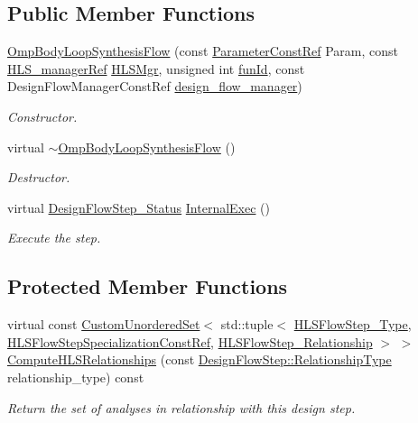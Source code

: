 \subsection*{Public Member Functions}
\begin{DoxyCompactItemize}
\item 
\hyperlink{classOmpBodyLoopSynthesisFlow_aae94b58f7ca30ae522a0c8ba5797b39f}{Omp\+Body\+Loop\+Synthesis\+Flow} (const \hyperlink{Parameter_8hpp_a37841774a6fcb479b597fdf8955eb4ea}{Parameter\+Const\+Ref} Param, const \hyperlink{hls__manager_8hpp_acd3842b8589fe52c08fc0b2fcc813bfe}{H\+L\+S\+\_\+manager\+Ref} \hyperlink{classHLS__step_ade85003a99d34134418451ddc46a18e9}{H\+L\+S\+Mgr}, unsigned int \hyperlink{classHLSFunctionStep_a3e6434fd86c698b0c70520b859bff5b0}{fun\+Id}, const Design\+Flow\+Manager\+Const\+Ref \hyperlink{classDesignFlowStep_ab770677ddf087613add30024e16a5554}{design\+\_\+flow\+\_\+manager})
\begin{DoxyCompactList}\small\item\em Constructor. \end{DoxyCompactList}\item 
virtual \hyperlink{classOmpBodyLoopSynthesisFlow_ac41e2b2369cafb03d9a7bb179fcd3cd1}{$\sim$\+Omp\+Body\+Loop\+Synthesis\+Flow} ()
\begin{DoxyCompactList}\small\item\em Destructor. \end{DoxyCompactList}\item 
virtual \hyperlink{design__flow__step_8hpp_afb1f0d73069c26076b8d31dbc8ebecdf}{Design\+Flow\+Step\+\_\+\+Status} \hyperlink{classOmpBodyLoopSynthesisFlow_a9279d43752bc4d96ecf9d9a93b98ab1a}{Internal\+Exec} ()
\begin{DoxyCompactList}\small\item\em Execute the step. \end{DoxyCompactList}\end{DoxyCompactItemize}
\subsection*{Protected Member Functions}
\begin{DoxyCompactItemize}
\item 
virtual const \hyperlink{classCustomUnorderedSet}{Custom\+Unordered\+Set}$<$ std\+::tuple$<$ \hyperlink{hls__step_8hpp_ada16bc22905016180e26fc7e39537f8d}{H\+L\+S\+Flow\+Step\+\_\+\+Type}, \hyperlink{hls__step_8hpp_a5fdd2edf290c196531d21d68e13f0e74}{H\+L\+S\+Flow\+Step\+Specialization\+Const\+Ref}, \hyperlink{hls__step_8hpp_a3ad360b9b11e6bf0683d5562a0ceb169}{H\+L\+S\+Flow\+Step\+\_\+\+Relationship} $>$ $>$ \hyperlink{classOmpBodyLoopSynthesisFlow_aaac534ef1f8dd35556e17e11abfcb76c}{Compute\+H\+L\+S\+Relationships} (const \hyperlink{classDesignFlowStep_a723a3baf19ff2ceb77bc13e099d0b1b7}{Design\+Flow\+Step\+::\+Relationship\+Type} relationship\+\_\+type) const
\begin{DoxyCompactList}\small\item\em Return the set of analyses in relationship with this design step. \end{DoxyCompactList}\end{DoxyCompactItemize}
